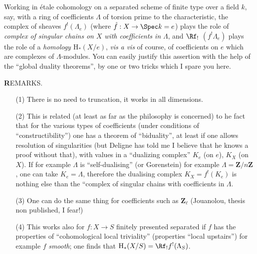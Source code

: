     Working in étale cohomology on a separated scheme of finite type over a field $k$, say, with a ring of coefficients $\Lambda$ of torsion prime to the characteristic, the complex of sheaves $f^!(\Lambda_e)$ (where $\hat{f}: X \to \Spec k = e$) plays the role of \emph{complex of singular chains on $X$ with coefficients in $\Lambda$}, and $\Rf_!$ $(f^! \Lambda_e)$ plays the role of a \emph{homology $\mathrm{H}_*(X/e)$}, \emph{vis a vis} of course, of coefficients on $e$ which are complexes of $\Lambda$-modules. You can easily justify this assertion with the help of the ``global duality theorems'', by one or two tricks which I spare you here.

{\textbf REMARKS}.
\begin{enumerate}
    \item[(1)] There is no need to truncation, it works in all dimensions.
    \item[(2)] This is related (at least as far as the philosophy is concerned) to he fact that for the various types of coefficients (under conditions of ``constructibility'') one has a theorem of ``biduality'', at least if one allows resolution of singularities (but Deligne has told me I believe that he knows a proof without that), with values in a ``dualizing complex'' $K_e$ (on $e$), $K_X$ (on $X$). If for example $\Lambda$ is ``self-dualising'' (or Gorenstein) for example $\Lambda = \mathbf{Z}/n \mathbf{Z}$, one can take $K_e = \Lambda$, therefore the dualising complex $K_X = f^! (K_e)$ is nothing else than the ``complex of singular chains with coefficients in $\Lambda$.
    \item[(3)] One can do the same thing for coefficients such as $\mathbf{Z}_{\ell}$ (Jouanolou, thesis non published, I fear!)
    \item[(4)] This works also for $f: X \to S$ finitely presented separated if $f$ has the properties of ``cohomological local triviality'' (properties ``local upstairs'') for example $f$ \emph{smooth}; one finds that $\mathrm{H}_*(X/S) = \Rf_! f^!(\Lambda_S)$.
\end{enumerate}

\starsbreak

